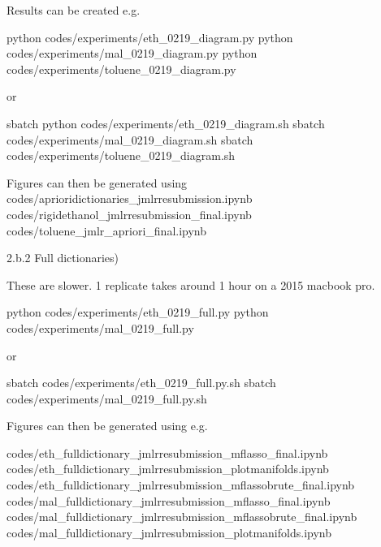 Results can be created e.g.

python codes/experiments/eth_0219_diagram.py
python codes/experiments/mal_0219_diagram.py
python codes/experiments/toluene_0219_diagram.py

or 

sbatch python codes/experiments/eth_0219_diagram.sh
sbatch codes/experiments/mal_0219_diagram.sh
sbatch codes/experiments/toluene_0219_diagram.sh

Figures can then be generated using
codes/aprioridictionaries_jmlrresubmission.ipynb
codes/rigidethanol_jmlrresubmission_final.ipynb
codes/toluene_jmlr_apriori_final.ipynb

2.b.2 Full dictionaries)

These are slower.  1 replicate takes around 1 hour on a 2015 macbook pro. 

python codes/experiments/eth_0219_full.py
python codes/experiments/mal_0219_full.py

or

sbatch codes/experiments/eth_0219_full.py.sh
sbatch codes/experiments/mal_0219_full.py.sh

Figures can then be generated using e.g.

codes/eth_fulldictionary_jmlrresubmission_mflasso_final.ipynb
codes/eth_fulldictionary_jmlrresubmission_plotmanifolds.ipynb
codes/eth_fulldictionary_jmlrresubmission_mflassobrute_final.ipynb
codes/mal_fulldictionary_jmlrresubmission_mflasso_final.ipynb
codes/mal_fulldictionary_jmlrresubmission_mflassobrute_final.ipynb
codes/mal_fulldictionary_jmlrresubmission_plotmanifolds.ipynb



